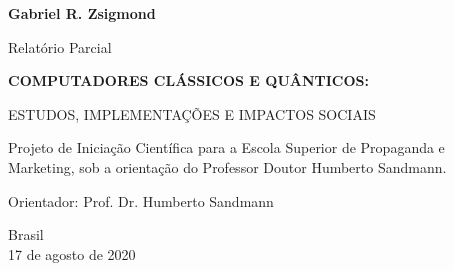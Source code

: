 \begin{titlepage}

    \begin{center}
        
        \textbf{Gabriel R. Zsigmond}
        
        \vspace{2cm}
        
        \Large
        Relatório Parcial
        \vspace{0.5cm}

        \LARGE
        \textbf{COMPUTADORES CLÁSSICOS E QUÂNTICOS:}
        
        \vspace{0.5cm}
        \large
        ESTUDOS, IMPLEMENTAÇÕES E IMPACTOS SOCIAIS
        
        
        \vspace{2cm}
        
        \large
        \begin{flushright}
            \begin{minipage}{10cm}
            Projeto de Iniciação Científica para a Escola Superior de Propaganda e Marketing, sob a orientação do Professor Doutor Humberto Sandmann.\linebreak[3]
            
            Orientador: Prof. Dr. Humberto Sandmann
            \end{minipage}
        \end{flushright}
        \vfill
        
        Brasil\\
        17 de agosto de 2020\\
        
    \end{center}

\end{titlepage}